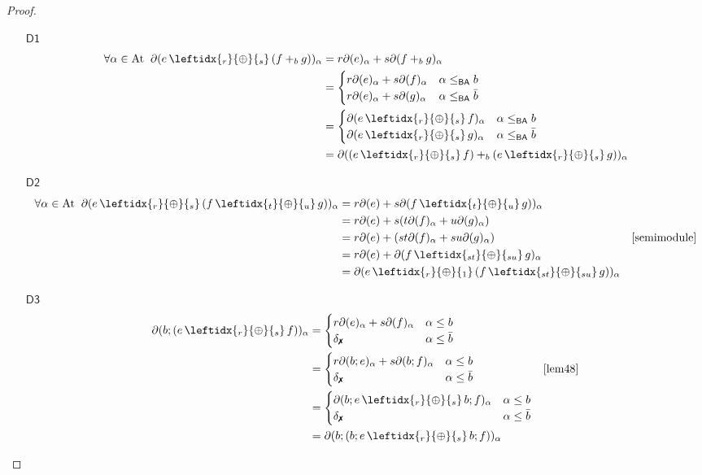 \documentclass[a4paper,UKenglish,cleveref, autoref, thm-restate]{lipics-v2021}
\newcommand{\xmark}{\text{\ding{55}}}
\newcommand{\At}{\text{\upshape{At}}}
\newcommand{\BA}{\textsf{BA}}
\newcommand{\WC}[2]{\,\leftidx{_{#1}}{{\oplus}}{_{#2}}\,}
\newcommand{\Ax}[1]{\ensuremath{\mathsf{#1}}}
\theoremstyle{plain}\newtheoremrep{thm}{Theorem}[section]
\begin{document}
\begin{toappendix}
\begin{proof}
\begin{enumerate}
				\item[\Ax{D1}]
				\begin{align*}
					\forall \alpha \in \At\;\;\partial(e \WC{r}{s} (f+_b g))_\alpha &= r\partial(e)_\alpha +s\partial(f+_b g)_\alpha\\
					&=\begin{cases}
						r\partial(e)_\alpha + s\partial(f)_\alpha & \alpha \leq_{\BA} b\\
						r\partial(e)_\alpha + s\partial(g)_\alpha & \alpha \leq_{\BA} \bar b\\
					\end{cases}\\
					&=\begin{cases}
						\partial(e \WC{r}{s} f)_\alpha & \alpha \leq_{\BA} b\\
						\partial(e \WC{r}{s} g)_\alpha & \alpha \leq_{\BA} \bar b\\
					\end{cases}\\
					& = \partial((e \WC{r}{s} f)+_b (e \WC{r}{s} g))_\alpha
				\end{align*}
				\item[\Ax{D2}]
				\begin{align*}
					\forall \alpha \in \At\;\;\partial(e\WC{r}{s} (f \WC{t}{u} g))_\alpha &= r\partial(e)+s\partial(f \WC{t}{u} g))_\alpha\\
					&= r\partial(e)+s(t\partial(f)_\alpha + u\partial(g)_\alpha)\\
					&= r\partial(e)+(st\partial(f)_\alpha + su\partial(g)_\alpha) & \cref{semimodule}\\
					&= r\partial(e)+\partial(f\WC{st}{su} g)_\alpha\\
					&= \partial(e \WC{r}{1} (f\WC{st}{su} g))_\alpha
				\end{align*}
				\item[\Ax{D3}]
				\begin{align*}
					\partial(b;(e \WC{r}{s} f))_\alpha &= \begin{cases}
						r\partial(e)_\alpha + s\partial(f)_\alpha & \alpha \leq b\\
						\delta_\xmark & \alpha \leq \bar b\\
					\end{cases}\\
					&= \begin{cases}
						r\partial(b;e)_\alpha + s\partial(b;f)_\alpha & \alpha \leq b\\
						\delta_\xmark & \alpha \leq \bar b\\
					\end{cases}& \cref{lem48}\\
					&= \begin{cases}
						\partial(b;e \WC{r}{s} b;f)_\alpha & \alpha \leq b\\
						\delta_\xmark & \alpha \leq \bar b\\
					\end{cases}\\
					&= \partial(b;(b;e \WC{r}{s} b;f))_\alpha 
				\end{align*}
				

\end{enumerate}
\end{proof}
\end{toappendix}
\end{document}
